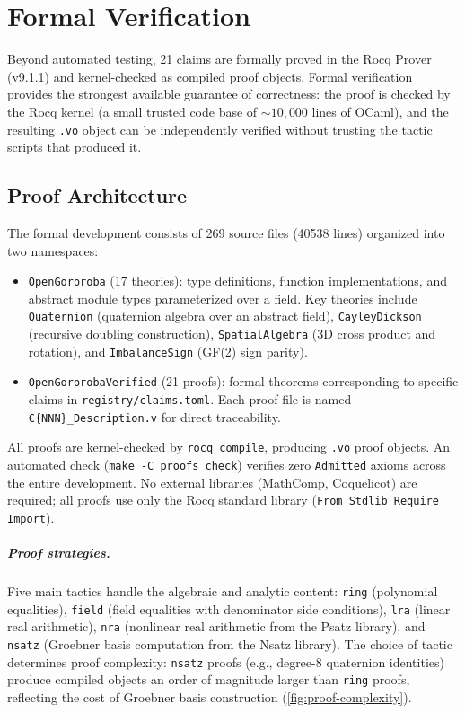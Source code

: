 \documentclass[12pt,openany]{report}
\theoremstyle{definition}
\theoremstyle{plain}
\theoremstyle{remark}
\newcommand{\prooffilecount}{269}
\newcommand{\prooflinecount}{40538}
\newcommand{\kernelchecked}{21}
\begin{document}
\chapter{Formal Verification}
\label{ch:formal}

Beyond automated testing, \kernelchecked{} claims are formally proved in the
Rocq Prover (v9.1.1) and kernel-checked as compiled proof objects.
Formal verification provides the strongest available guarantee of
correctness: the proof is checked by the Rocq kernel (a small trusted
code base of ${\sim}10{,}000$ lines of OCaml), and the resulting
\texttt{.vo} object can be independently verified without trusting the
tactic scripts that produced it.

\section{Proof Architecture}

The formal development consists of \prooffilecount{} source files
(\prooflinecount{} lines) organized into two namespaces:
\begin{itemize}
  \item \texttt{OpenGororoba} (17 theories): type definitions, function
    implementations, and abstract module types parameterized over a field.
    Key theories include \texttt{Quaternion} (quaternion algebra over an
    abstract field), \texttt{CayleyDickson} (recursive doubling
    construction), \texttt{SpatialAlgebra} (3D cross product and rotation),
    and \texttt{ImbalanceSign} (GF(2) sign parity).
  \item \texttt{OpenGororobaVerified} (21 proofs): formal theorems
    corresponding to specific claims in \texttt{registry/claims.toml}.
    Each proof file is named \texttt{C\{NNN\}\_Description.v} for
    direct traceability.
\end{itemize}

All proofs are kernel-checked by \texttt{rocq compile}, producing
\texttt{.vo} proof objects.  An automated check (\texttt{make -C proofs
check}) verifies zero \texttt{Admitted} axioms across the entire
development.  No external libraries (MathComp, Coquelicot) are
required; all proofs use only the Rocq standard library
(\texttt{From Stdlib Require Import}).

\paragraph{Proof strategies.}
Five main tactics handle the algebraic and analytic content:
\texttt{ring} (polynomial equalities), \texttt{field} (field equalities
with denominator side conditions), \texttt{lra} (linear real
arithmetic), \texttt{nra} (nonlinear real arithmetic from the Psatz
library), and \texttt{nsatz} (Groebner basis computation from the Nsatz
library).  The choice of tactic determines proof complexity:
\texttt{nsatz} proofs (e.g., degree-8 quaternion identities) produce
compiled objects an order of magnitude larger than \texttt{ring} proofs,
reflecting the cost of Groebner basis construction
(\cref{fig:proof-complexity}).
\end{document}
